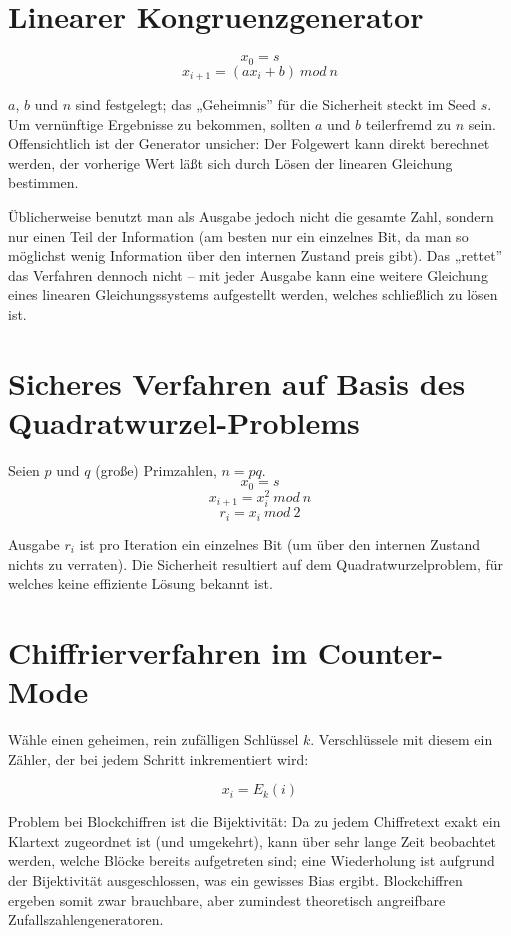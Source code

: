 \section{Linearer Kongruenzgenerator}

$$x_0 = s $$
$$x_{i+1} = (a x_i + b)\ mod\ n$$

$a$, $b$ und $n$ sind festgelegt; das „Geheimnis” für die Sicherheit steckt im Seed $s$. Um vernünftige Ergebnisse zu bekommen, sollten $a$ und $b$ teilerfremd zu $n$ sein. Offensichtlich ist der Generator unsicher: Der Folgewert kann direkt berechnet werden, der vorherige Wert läßt sich durch Lösen der linearen Gleichung bestimmen.

Üblicherweise benutzt man als Ausgabe jedoch nicht die gesamte Zahl, sondern nur einen Teil der Information (am besten nur ein einzelnes Bit, da man so möglichst wenig Information über den internen Zustand preis gibt). Das „rettet” das Verfahren dennoch nicht -- mit jeder Ausgabe kann eine weitere Gleichung eines linearen Gleichungssystems aufgestellt werden, welches schließlich zu lösen ist.

\section{Sicheres Verfahren auf Basis des Quadratwurzel-Problems}

Seien $p$ und $q$ (große) Primzahlen, $n=p q$.
$$x_0 = s $$
$$x_{i+1} = x_i^2\ mod\ n$$
$$r_i = x_i\ mod\ 2$$

Ausgabe $r_i$ ist pro Iteration ein einzelnes Bit (um über den internen Zustand nichts zu verraten). Die Sicherheit resultiert auf dem Quadratwurzelproblem, für welches keine effiziente Lösung bekannt ist.

\section{Chiffrierverfahren im Counter-Mode}

Wähle einen geheimen, rein zufälligen Schlüssel $k$. Verschlüssele mit diesem ein Zähler, der bei jedem Schritt inkrementiert wird:

$$x_i = E_k(i)$$

Problem bei Blockchiffren ist die Bijektivität: Da zu jedem Chiffretext exakt ein Klartext zugeordnet ist (und umgekehrt), kann über sehr lange Zeit beobachtet werden, welche Blöcke bereits aufgetreten sind; eine Wiederholung ist aufgrund der Bijektivität ausgeschlossen, was ein gewisses Bias ergibt. Blockchiffren ergeben somit zwar brauchbare, aber zumindest theoretisch angreifbare Zufallszahlengeneratoren.


